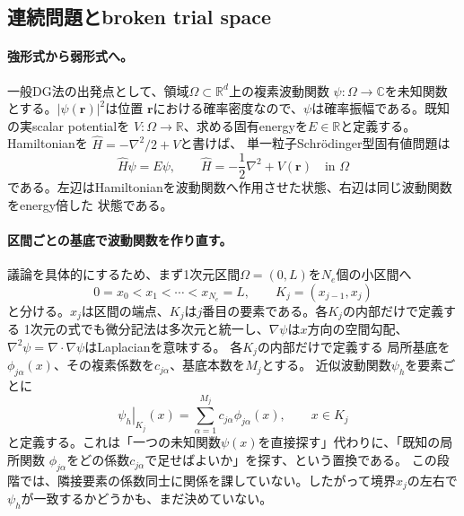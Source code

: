 \documentclass[11pt,a4paper]{article}
\newcommand{\laplacian}{\nabla^2}
\begin{document}
\subsection{連続問題とbroken trial space}
\paragraph{強形式から弱形式へ。}
一般DG法の出発点として、領域$\Omega\subset\mathbb R^d$上の複素波動関数
$\psi:\Omega\to\mathbb C$を未知関数とする。$|\psi(\boldsymbol r)|^2$は位置
$\boldsymbol r$における確率密度なので、$\psi$は確率振幅である。既知の実scalar potentialを
$V:\Omega\to\mathbb R$、求める固有energyを$E\in\mathbb R$と定義する。Hamiltonianを
$\hat H=-\laplacian/2+V$と書けば、
単一粒子Schr\"odinger型固有値問題は
\begin{equation}
 \hat H\psi=E\psi,
 \qquad \hat H=-\frac12\laplacian+V(\boldsymbol r)
 \quad\text{in }\Omega
 \label{eq:general-strong}
\end{equation}
である。左辺はHamiltonianを波動関数へ作用させた状態、右辺は同じ波動関数をenergy倍した
状態である。

\paragraph{区間ごとの基底で波動関数を作り直す。}
議論を具体的にするため、まず1次元区間$\Omega=(0,L)$を$N_e$個の小区間へ
\begin{equation}
 0=x_0<x_1<\cdots<x_{N_e}=L,
 \qquad K_j=(x_{j-1},x_j)
 \label{eq:1d-mesh}
\end{equation}
と分ける。$x_j$は区間の端点、$K_j$は$j$番目の要素である。各$K_j$の内部だけで定義する
1次元の式でも微分記法は多次元と統一し、$\nabla\psi$は$x$方向の空間勾配、
$\laplacian\psi=\nabla\!\cdot\!\nabla\psi$はLaplacianを意味する。
各$K_j$の内部だけで定義する
局所基底を$\phi_{j\alpha}(x)$、その複素係数を$c_{j\alpha}$、基底本数を$M_j$とする。
近似波動関数$\psi_h$を要素ごとに
\begin{equation}
 \left.\psi_h\right|_{K_j}(x)
 =\sum_{\alpha=1}^{M_j}c_{j\alpha}\phi_{j\alpha}(x),
 \qquad x\in K_j
 \label{eq:piecewise-ansatz}
\end{equation}
と定義する。これは「一つの未知関数$\psi(x)$を直接探す」代わりに、「既知の局所関数
$\phi_{j\alpha}$をどの係数$c_{j\alpha}$で足せばよいか」を探す、という置換である。
この段階では、隣接要素の係数同士に関係を課していない。したがって境界$x_j$の左右で
$\psi_h$が一致するかどうかも、まだ決めていない。
\end{document}
